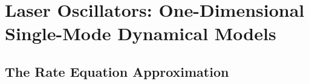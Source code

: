 %
%
%
%

 \section{Laser Oscillators: One-Dimensional Single-Mode Dynamical Models\label{sct:laser_dynamics_1d_sml_sml}}

 \subsection{The Rate Equation Approximation\label{sct:laser_dynamics_1d_sml_rea}}

 
